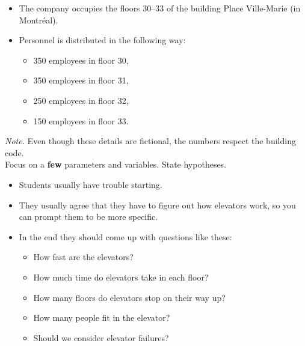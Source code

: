\begin{itemize}
	\item The company occupies the floors 30--33 of the building Place Ville-Marie (in Montr\'eal).

	\item Personnel is distributed in the following way: 
	\begin{itemize}
		\item 350 employees in floor 30,
		\item 350 employees in floor 31,
		\item 250 employees in floor 32, 
		\item 150 employees in floor 33.
	\end{itemize}
\end{itemize}

\textsl{Note.} Even though these details are fictional, the numbers respect the building code. \\

Focus on a \textbf{few} parameters and variables. State hypotheses.


\begin{annotation}
	\begin{notes}
		\begin{itemize}
			\item Students usually have trouble starting. 
			\item They usually agree that they have to figure out how elevators work, so you can prompt them to be more specific. 
			
			\item In the end they should come up with questions like these:
			\begin{itemize}
				\item How fast are the elevators?
				\item How much time do elevators take in each floor?
				\item How many floors do elevators stop on their way up?
				\item How many people fit in the elevator?
				\item Should we consider elevator failures?
			\end{itemize}
		\end{itemize}	
	\end{notes}
\end{annotation}

\bookonlynewpage

\question

